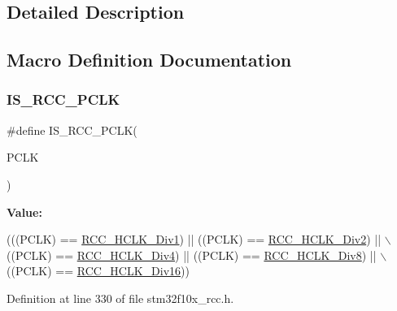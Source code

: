 \subsection{Detailed Description}


\subsection{Macro Definition Documentation}
\mbox{\label{group___a_p_b1___a_p_b2__clock__source_gab70f1257ea47c1da4def8e351af4d9f2}} 
\subsubsection{\texorpdfstring{I\+S\+\_\+\+R\+C\+C\+\_\+\+P\+C\+LK}{IS\_RCC\_PCLK}}
{\footnotesize\ttfamily \#define I\+S\+\_\+\+R\+C\+C\+\_\+\+P\+C\+LK(\begin{DoxyParamCaption}\item[{}]{P\+C\+LK }\end{DoxyParamCaption})}

{\bfseries Value\+:}
\begin{DoxyCode}
(((PCLK) == \hyperlink{group___a_p_b1___a_p_b2__clock__source_gae62b4a39ae69cc221f2ab7d4518bfb76}{RCC\_HCLK\_Div1}) || ((PCLK) == \hyperlink{group___a_p_b1___a_p_b2__clock__source_ga177bb3648def9a961c16f93f15ca0f62}{RCC\_HCLK\_Div2}) || \(\backslash\)
                           ((PCLK) == \hyperlink{group___a_p_b1___a_p_b2__clock__source_gafd8cf0e32a3ea5648cdc054766bc2017}{RCC\_HCLK\_Div4}) || ((PCLK) == 
      \hyperlink{group___a_p_b1___a_p_b2__clock__source_gab2e2b6e0b8fe22d6638b672918b22097}{RCC\_HCLK\_Div8}) || \(\backslash\)
                           ((PCLK) == \hyperlink{group___a_p_b1___a_p_b2__clock__source_ga6353aaa0b302fdd5d946fd21756e2273}{RCC\_HCLK\_Div16}))
\end{DoxyCode}


Definition at line 330 of file stm32f10x\+\_\+rcc.\+h.

\mbox{\label{group___a_p_b1___a_p_b2__clock__source_gae62b4a39ae69cc221f2ab7d4518bfb76}} 
